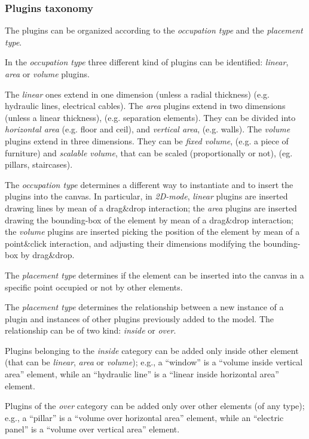 \subsubsection{Plugins taxonomy}\label{ssec:taxonomy}

\noindent The plugins can be organized according to the \emph{occupation type} and the \emph{placement type}. 

\noindent In the \emph{occupation type} three different kind of plugins can be identified: \emph{linear}, \emph{area} or \emph{volume} plugins.

\noindent The \emph{linear} ones extend in one dimension (unless a radial thickness) (e.g. hydraulic lines, electrical cables). The \emph{area} plugins extend in two dimensions (unless a linear thickness), (e.g. separation elements). They can be divided into \emph{horizontal area} (e.g. floor and ceil), and \emph{vertical area}, (e.g. walls). The \emph{volume} plugins extend in three dimensions. They can be \emph{fixed volume}, (e.g. a piece of furniture) and \emph{scalable volume}, that can be scaled (proportionally or not), (eg. pillars, staircases).

\noindent The \emph{occupation type} determines a different way to instantiate and to insert the plugins into the canvas.
In particular, in \emph{2D-mode}, \emph{linear} plugins are inserted drawing lines by mean of a drag\&drop interaction;
the \emph{area} plugins are inserted drawing the bounding-box of the element by mean of a drag\&drop interaction;
the \emph{volume} plugins are inserted picking the position of the element by mean of a point\&click interaction,
and adjusting their dimensions modifying the bounding-box by drag\&drop.

\noindent The \emph{placement type} determines if the element can be inserted into the canvas in a specific point occupied or not by other elements.

\noindent The \emph{placement type} determines the relationship between a new instance of a plugin and instances of other plugins previously added to the model. The relationship can be of two kind: \emph{inside} or \emph{over}.

\noindent Plugins belonging to the \emph{inside} category can be added only inside other element (that can be \emph{linear}, \emph{area} or \emph{volume}); e.g., a ``window'' is a ``volume inside vertical area'' element,
while an ``hydraulic line'' is a ``linear inside horizontal area'' element.

\noindent Plugins of the \emph{over} category can be added only over other elements (of any type);
e.g., a ``pillar'' is a ``volume over horizontal area'' element,
while an ``electric panel'' is a ``volume over vertical area'' element.

